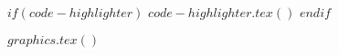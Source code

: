 \usepackage{natbib}
\usepackage[utf8]{inputenc}
\usepackage[T1]{fontenc}
\usepackage{lmodern}
\usepackage{graphicx}
\usepackage[style=base,figurename=Fig.,labelfont=bf,labelsep=period]{caption}
\usepackage{subcaption}
\usepackage{amsmath}
\usepackage{newtxtext,newtxmath}
\usepackage[colorlinks=true,citecolor=red,linkcolor=black]{hyperref}
\usepackage{longtable,booktabs,array}


$if(code-highlighter)$
$code-highlighter.tex()$
$endif$

$graphics.tex()$

%
